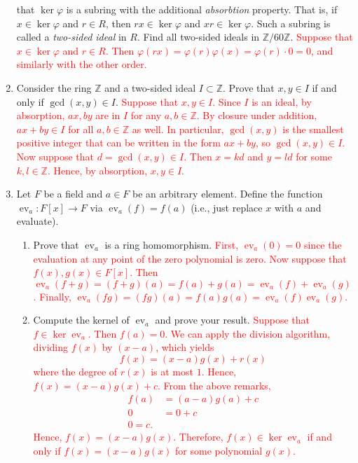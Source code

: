 \documentclass[12pt]{article}
\newcommand{\bbZ}{\mathbb{Z}}
\newcommand{\solution}[1]{\textcolor{red}{#1}}
\newcommand{\ev}{\operatorname{ev}}
\begin{document}
\begin{enumerate}
  that $\ker \varphi$ is a subring with the additional
  \emph{absorbtion} property. That is, if $x\in \ker \varphi$ and
  $r\in R$, then $rx\in \ker \varphi$ and $xr\in \ker \varphi$. Such a
  subring is called a \emph{two-sided ideal} in $R$. Find all
  two-sided ideals in $\bbZ/60\bbZ$. 
\solution{Suppose that $x\in \ker \varphi$ and $r\in R$. Then
  $\varphi(rx)=\varphi(r)\varphi(x) = \varphi(r)\cdot 0 = 0$, and
  similarly with the other order.}
\item Consider the ring $\bbZ$ and a two-sided ideal $I\subset \bbZ$. Prove
  that $x,y\in I$ if and only if $\gcd(x,y)\in I$. 
\solution{
Suppose that $x,y\in I$. Since $I$ is an ideal, by absorption, $ax, by$ are in $I$
for any $a,b\in \bbZ$. By closure under addition, $ax+by\in I$ for all
$a,b\in \bbZ$ as well. In particular, $\gcd(x,y)$ is the smallest
positive integer that can be written in the form $ax+by$, so
$\gcd(x,y)\in I$. 
Now suppose that $d=\gcd(x,y)\in I$. Then $x=kd$ and $y=ld$ for some
$k,l\in \bbZ$. Hence, by absorption, $x,y\in I$. }
\item Let $F$ be a field and $a\in F$ be an arbitrary element. Define
  the function $\ev_a: F[x]\rightarrow F$ via $\ev_a(f) = f(a)$ (i.e.,
  just replace $x$ with $a$ and evaluate).
  \begin{enumerate}
  \item Prove that $\ev_a$ is a ring homomorphism. 
\solution{First, $\ev_a(0)=0$ since the evaluation at any point of the
  zero polynomial is zero. Now suppose that $f(x), g(x)\in F[x]$. Then
  $\ev_a(f+g)=(f+g)(a)=f(a)+g(a)=\ev_a(f)+\ev_a(g)$. Finally,
  $\ev_a(fg)=(fg)(a)=f(a)g(a)=\ev_a(f)\ev_a(g)$. }
  \item Compute the kernel of $\ev_a$ and prove your result. 
\solution{Suppose that $f\in \ker \ev_a$. Then $f(a)=0$. We can apply
  the division algorithm, dividing $f(x)$ by $(x-a)$, which yields 
  \[f(x)=(x-a)g(x)+r(x)\] where the degree of $r(x)$ is at most
  $1$. Hence, $f(x)=(x-a)g(x)+c$. From the above remarks,
  \begin{align*}
    f(a)&= (a-a)g(a)+c\\
0 &= 0+c\\
0=c.
  \end{align*}
Hence, $f(x)=(x-a)g(x)$. Therefore, $f(x)\in \ker \ev_a$ if and only
if $f(x)=(x-a)g(x)$ for some polynomial $g(x)$. }


  \end{enumerate}


\end{enumerate}
\end{document}
